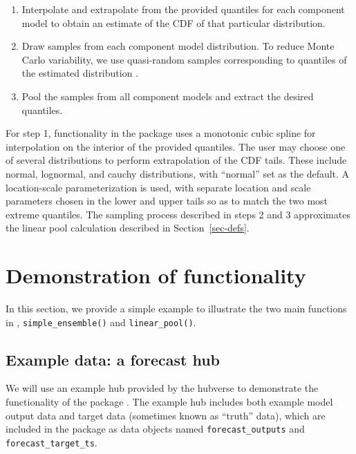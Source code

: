\documentclass[
  article,
  shortnames,
  notitle]{jss}
\providecommand{\tightlist}{%
  \setlength{\itemsep}{0pt}\setlength{\parskip}{0pt}}\usepackage{longtable,booktabs,array}
\begin{document}
\begin{enumerate}
\def\labelenumi{\arabic{enumi}.}
\tightlist
\item
  Interpolate and extrapolate from the provided quantiles for each
  component model to obtain an estimate of the CDF of that particular
  distribution.
\item
  Draw samples from each component model distribution. To reduce Monte
  Carlo variability, we use quasi-random samples corresponding to
  quantiles of the estimated distribution
  \citep{niederreiter1992quasirandom}.
\item
  Pool the samples from all component models and extract the desired
  quantiles.
\end{enumerate}

For step 1, functionality in the  package uses a
monotonic cubic spline for interpolation on the interior of the provided
quantiles. The user may choose one of several distributions to perform
extrapolation of the CDF tails. These include normal, lognormal, and
cauchy distributions, with ``normal'' set as the default. A
location-scale parameterization is used, with separate location and
scale parameters chosen in the lower and upper tails so as to match the
two most extreme quantiles. The sampling process described in steps 2
and 3 approximates the linear pool calculation described in
Section~\ref{sec-defs}.

\section{Demonstration of functionality}\label{sec-simple-ex}

In this section, we provide a simple example to illustrate the two main
functions in , \texttt{simple\_ensemble()} and
\texttt{linear\_pool()}.

\subsection{Example data: a forecast
hub}\label{example-data-a-forecast-hub}

We will use an example hub provided by the hubverse to demonstrate the
functionality of the  package \citep{hubverse_docs}.
The example hub includes both example model output data and target data
(sometimes known as ``truth'' data), which are included in the
 package as data objects named
\texttt{forecast\_outputs} and \texttt{forecast\_target\_ts}.
\end{document}
